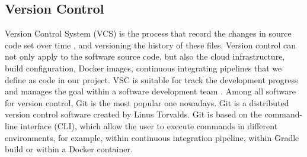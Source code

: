 \subsection{Version Control}
\label{vcs}
Version Control System (VCS) is the process that record the changes in source code set over time \cite{GitAbout93:online}, and versioning the history of these files. 
Version control can not only apply to the software source code, but also the cloud infrastructure, build configuration, Docker images, continuous integrating pipelines that we define as code in our project.
VSC is suitable for track the development progress and manages the goal within a software development team \cite{loeliger2012version}. Among all software for version control, Git is the most popular one nowadays.
Git is a distributed version control software created by Linus Torvalds. Git is based on the command-line interface (CLI), which allow the user to execute commands in different environments, for example, within continuous integration pipeline, within Gradle build or within a Docker container.

